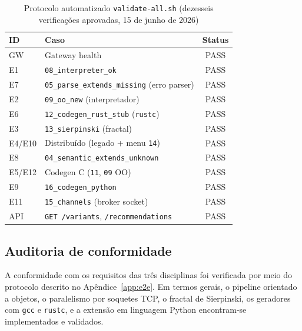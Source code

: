 \documentclass[12pt]{article}
\begin{document}
\begin{table}[htbp]
\centering
\small
\caption{Protocolo automatizado \texttt{validate-all.sh} (dezesseis verificações aprovadas, 15 de junho de 2026)}
\label{tab:validation-e2e}
\begin{tabularx}{\textwidth}{|l|Y|c|}
\hline
\textbf{ID} & \textbf{Caso} & \textbf{Status} \\
\hline
GW & Gateway health & PASS \\
E1 & \texttt{08\_interpreter\_ok} & PASS \\
E7 & \texttt{05\_parse\_extends\_missing} (erro parser) & PASS \\
E2 & \texttt{09\_oo\_new} (interpretador) & PASS \\
E6 & \texttt{12\_codegen\_rust\_stub} (\texttt{rustc}) & PASS \\
E3 & \texttt{13\_sierpinski} (fractal) & PASS \\
E4/E10 & Distribuído (legado + menu \texttt{14}) & PASS \\
E8 & \texttt{04\_semantic\_extends\_unknown} & PASS \\
E5/E12 & Codegen C (\texttt{11}, \texttt{09} OO) & PASS \\
E9 & \texttt{16\_codegen\_python} & PASS \\
E11 & \texttt{15\_channels} (broker socket) & PASS \\
API & \texttt{GET /variants}, \texttt{/recommendations} & PASS \\
\hline
\end{tabularx}
\end{table}

\subsection{Auditoria de conformidade}
A conformidade com os requisitos das três disciplinas foi verificada por meio do protocolo descrito no Apêndice~\ref{app:e2e}. Em termos gerais, o pipeline orientado a objetos, o paralelismo por soquetes TCP, o fractal de Sierpinski, os geradores com \texttt{gcc} e \texttt{rustc}, e a extensão em linguagem Python encontram-se implementados e validados.
\end{document}

